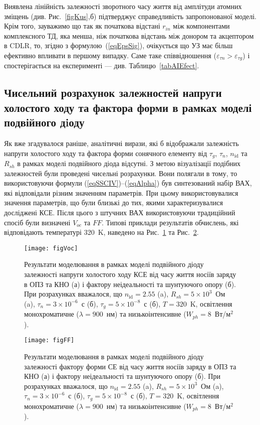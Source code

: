 Виявлена лінійність залежності зворотного часу життя від амплітуди атомних зміщень (див. Рис.~\ref{figKus},б) підтверджує
справедливість запропонованої моделі.
Крім того, зауважимо що так як початкова відстані $r_{in}$ між компонентами комплексного ТД, яка  менша, ніж початкова відстань між донором та акцептором в CDLR,
то, згідно з формулою~(\ref{eqEpsSig}), очікується що УЗ має більш ефективно впливати в першому випадку.
Саме таке співвідношення ($\varepsilon_{\tau n}>\varepsilon_{\tau g}$) і спостерігається на експерименті --- див. Таблицю~\ref{tabAIEfect}.


\subsection{Чисельний розрахунок залежностей напруги холостого ходу та фактора форми в рамках моделі подвійного дiоду\label{sbVocSim}}


Як вже згадувалося раніше,
аналітичні вирази, які б відображали залежність напруги холостого ходу та фактора форми сонячного елементу
від $\tau_g$, $\tau_n$, $n_{\mathrm{id}}$ та $R_{sh}$ в рамках  моделі подвійного діода відсутні.
З метою візуалізації подібних залежностей були проведені чисельні розрахунки.
Вони полягали в тому, то використовуючи
формули (\ref{eqSSCIV})--(\ref{eqAlpha}) був синтезований набір ВАХ, які відповідали різним
значенням параметрів.
При цьому використовувалися значення параметрів, що були близькі до тих, якими характеризувалися досліджені КСЕ.
Після цього з штучних ВАХ використовуючи традиційний спосіб були визначені $V_{oc}$ та $F\!F$.
Типові приклади результатів обчислень, які відповідають температурі 320~K, наведено на Рис.~\ref{figVoc} та Рис.~\ref{figFF}.


\begin{figure}
\center
\texttt{[image: figVoc]}
\caption{\label{figVoc}
Результати моделювання в рамках моделі подвійного діоду залежності напруги холостого ходу КСЕ від часу життя носіїв заряду в ОПЗ та КНО (а) і
фактору неідеальності та шунтуючого опору (б).
При розрахунках вважалося, що $n_\mathrm{id}=2.55$ (a), $R_{sh}=5\times10^3$~Ом (a), $\tau_n=3\times10^{-6}$~с (б), $\tau_g=5\times10^{-8}$~с (б), $T=320$~K,
освітлення монохроматичне ($\lambda=900$~нм) та низькоінтенсивне ($W_{ph}=8$~Вт/м$^2$).
}%
\end{figure}


\begin{figure}
\center
\texttt{[image: figFF]}
\caption{\label{figFF}
Результати моделювання в рамках моделі подвійного діоду залежності фактору форми СЕ від часу життя носіїв заряду в ОПЗ та КНО (а) і
фактору неідеальності та шунтуючого опору (б).
При розрахунках вважалося, що $n_\mathrm{id}=2.55$ (a), $R_{sh}=5\times10^3$~Ом (a), $\tau_n=3\times10^{-6}$~с (б), $\tau_g=5\times10^{-8}$~с (б), $T=320$~K,
освітлення монохроматичне ($\lambda=900$~нм) та низькоінтенсивне ($W_{ph}=8$~Вт/м$^2$).
}%
\end{figure}

